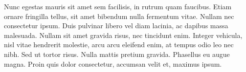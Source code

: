 Nunc egestas mauris sit amet sem facilisis, in rutrum quam faucibus. Etiam ornare fringilla tellus, sit amet bibendum nulla fermentum vitae. Nullam nec consectetur ipsum. Duis pulvinar libero vel diam lacinia, ac dapibus massa malesuada. Nullam sit amet gravida risus, nec tincidunt enim. Integer vehicula, nisl vitae hendrerit molestie, arcu arcu eleifend enim, at tempus odio leo nec nibh. Sed ut tortor risus. Nulla mattis pretium gravida. Phasellus eu augue magna. Proin quis dolor consectetur, accumsan velit et, maximus ipsum. 